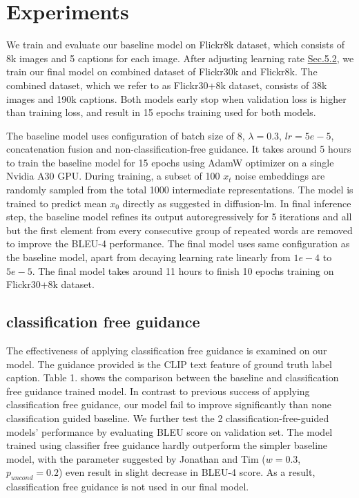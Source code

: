\documentclass{article}
\begin{document}
\section{Experiments}
We train and evaluate our baseline model on Flickr8k\cite{flickr8k} dataset, which consists of 8k images and 5 captions for each image. After adjusting learning rate \hyperref[sec:lr-exp]{Sec.5.2}, we train our final model on combined dataset of Flickr30k\cite{flickr30k} and Flickr8k\cite{flickr8k}. The combined dataset, which we refer to as Flickr30+8k dataset, consists of 38k images and 190k captions. Both models early stop when validation loss is higher than training loss, and result in 15 epochs training used for both models.

The baseline model uses configuration of batch size of 8, $\lambda = 0.3$, $lr = 5e-5$, concatenation fusion and non-classification-free guidance. It takes around 5 hours to train the baseline model for 15 epochs using AdamW optimizer on a single Nvidia A30 GPU. During training, a subset of 100 $x_t$ noise embeddings are randomly sampled from the total 1000 intermediate representations. The model is trained to predict mean $x_0$ directly as suggested in diffusion-lm\cite{diffuselm}. In final inference step, the baseline model refines its output autoregressively for 5 iterations and all but the first element from every consecutive group of repeated words are removed to improve the BLEU-4 performance. The final model uses same configuration as the baseline model, apart from decaying learning rate linearly from $1e-4$ to $5e-5$. The final model takes around 11 hours to finish 10 epochs training on Flickr30+8k dataset.

\subsection{classification free guidance}
\label{sec:classification-free-exp}
The effectiveness of applying classification free guidance is examined on our model. The guidance provided is the CLIP text feature of ground truth label caption. Table 1. shows the comparison between the baseline and classification free guidance trained model. In contrast to previous success of applying classification free guidance, our model fail to improve significantly than none classification guided baseline. We further test the 2 classification-free-guided models' performance by evaluating BLEU score on validation set. The model trained using classifier free guidance hardly outperform the simpler baseline model, with the parameter suggested by Jonathan and Tim \cite{classifier-free} ($w = 0.3$, $p_{uncond} = 0.2$) even result in slight decrease in BLEU-4 score. As a result, classification free guidance is not used in our final model.
\end{document}
